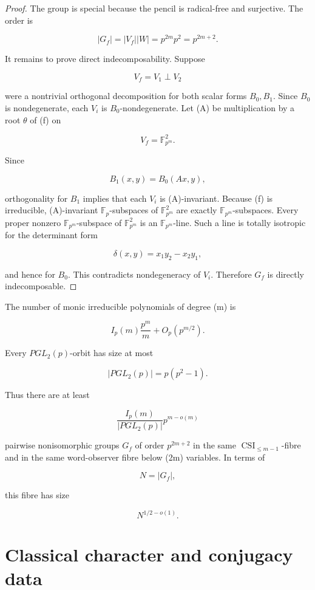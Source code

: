 \documentclass[11pt]{article}
\begin{document}
\begin{proof}
The group is special because the pencil is radical-free and surjective. The order is

\[
|G_f|=|V_f||W|=p^{2m}p^2=p^{2m+2}.
\]

It remains to prove direct indecomposability. Suppose

\[
V_f=V_1\perp V_2
\]

were a nontrivial orthogonal decomposition for both scalar forms $B_0,B_1$. Since $B_0$ is nondegenerate, each $V_i$ is $B_0$-nondegenerate. Let (A) be multiplication by a root $\theta$ of (f) on

\[
V_f=\mathbb F_{p^m}^2.
\]

Since

\[
B_1(x,y)=B_0(Ax,y),
\]

orthogonality for $B_1$ implies that each $V_i$ is (A)-invariant. Because (f) is irreducible, (A)-invariant $\mathbb F_p$-subspaces of $\mathbb F_{p^m}^2$ are exactly $\mathbb F_{p^m}$-subspaces. Every proper nonzero $\mathbb F_{p^m}$-subspace of $\mathbb F_{p^m}^2$ is an $\mathbb F_{p^m}$-line. Such a line is totally isotropic for the determinant form

\[
\delta(x,y)=x_1y_2-x_2y_1,
\]

and hence for $B_0$. This contradicts nondegeneracy of $V_i$. Therefore $G_f$ is directly indecomposable.

\end{proof}

The number of monic irreducible polynomials of degree (m) is

\[
I_p(m)
\frac{p^m}{m}+O_p(p^{m/2}).
\]

Every $PGL_2(p)$-orbit has size at most

\[
|PGL_2(p)|=p(p^2-1).
\]

Thus there are at least

\[
\frac{I_p(m)}{|PGL_2(p)|}
p^{m-o(m)}
\]

pairwise nonisomorphic groups $G_f$ of order $p^{2m+2}$ in the same $\operatorname{CSI}_{\le m-1}$-fibre and in the same word-observer fibre below (2m) variables. In terms of

\[
N=|G_f|,
\]

this fibre has size

\[
N^{1/2-o(1)}.
\]

\section{Classical character and conjugacy data}
\end{document}
